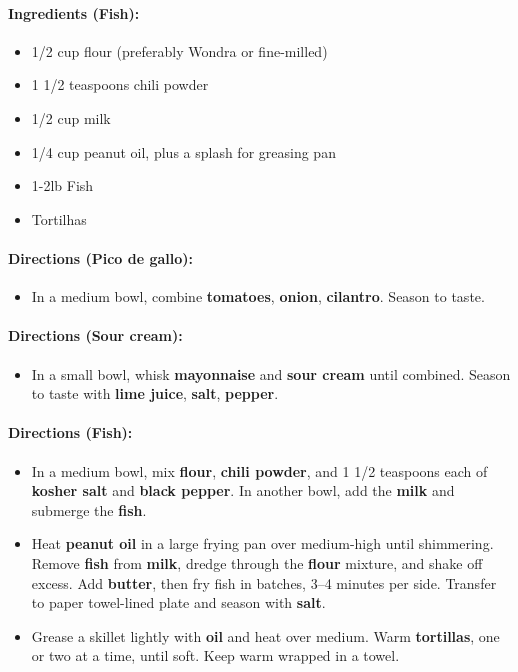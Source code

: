 \documentclass{article}
\begin{document}
\paragraph{Ingredients (Fish):}
\begin{itemize}
    \item 1/2 cup flour (preferably Wondra or fine-milled)
    \item 1 1/2 teaspoons chili powder
    \item 1/2 cup milk
    \item 1/4 cup peanut oil, plus a splash for greasing pan
    \item 1-2lb Fish
    \item Tortilhas
\end{itemize}  

\paragraph{Directions (Pico de gallo):}
\begin{itemize}
    \item In a medium bowl, combine \textbf{tomatoes}, \textbf{onion}, \textbf{cilantro}. Season to taste.
\end{itemize}  

\paragraph{Directions (Sour cream):}
\begin{itemize}
    \item In a small bowl, whisk \textbf{mayonnaise} and \textbf{sour cream} until combined. Season to taste with \textbf{lime juice}, \textbf{salt}, \textbf{pepper}.
\end{itemize}  

\paragraph{Directions (Fish):}
\begin{itemize}
    \item In a medium bowl, mix \textbf{flour}, \textbf{chili powder}, and 1 1/2 teaspoons each of \textbf{kosher salt} and \textbf{black pepper}. In another bowl, add the \textbf{milk} and submerge the \textbf{fish}.
    \item Heat \textbf{peanut oil} in a large frying pan over medium-high until shimmering. Remove \textbf{fish} from \textbf{milk}, dredge through the \textbf{flour} mixture, and shake off excess. Add \textbf{butter}, then fry fish in batches, 3–4 minutes per side. Transfer to paper towel-lined plate and season with \textbf{salt}.
    \item Grease a skillet lightly with \textbf{oil} and heat over medium. Warm \textbf{tortillas}, one or two at a time, until soft. Keep warm wrapped in a towel.
\end{itemize} 
\end{document}
